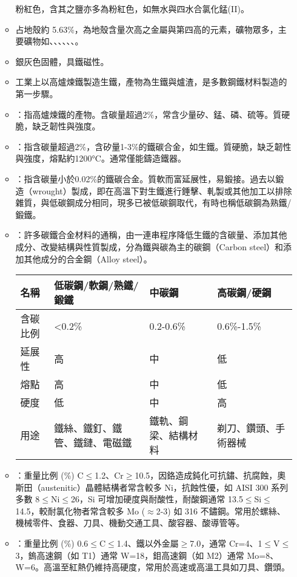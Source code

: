 \documentclass[a4paper,12pt]{report}
\begin{document}
\begin{itemize}
\begin{itemize}
粉紅色，含其之鹽亦多為粉紅色，如無水與四水合氯化錳(II)。
\bit
\item 占地殼約 5.63\%，為地殼含量次高之金屬與第四高的元素，礦物眾多，主要礦物如、、、、、、。
\item 銀灰色固體，具鐵磁性。
\item 工業上以高爐煉鐵製造生鐵，產物為生鐵與爐渣，是多數鋼鐵材料製造的第一步驟。
\item {}：指高爐煉鐵的產物。含碳量超過2\%，常含少量矽、錳、磷、硫等。質硬脆，缺乏韌性與強度。
\item {}：指含碳量超過2\%，含矽量1-3\%的鐵碳合金，如生鐵。質硬脆，缺乏韌性與強度，熔點約1200°C。通常僅能鑄造鐵器。
\item {}：指含碳量小於0.02\%的鐵碳合金。質軟而富延展性，易鍛接。過去以鍛造（wrought）製成，即在高溫下對生鐵進行錘擊、軋製或其他加工以排除雜質，與低碳鋼成分相同，現多已被低碳鋼取代，有時也稱低碳鋼為熟鐵/鍛鐵。
\item {}：許多碳鐵合金材料的通稱，由一連串程序降低生鐵的含碳量、添加其他成分、改變結構與性質製成，分為鐵與碳為主的碳鋼（Carbon steel）和添加其他成分的合金鋼（Alloy steel）。
\eit
{}
\begin{longtable}[c]{|p{0.2\tw}|p{0.2\tw}|p{0.2\tw}|p{0.2\tw}|}
\hline
名稱 & 低碳鋼/軟鋼/熟鐵/鍛鐵 & 中碳鋼 & 高碳鋼/硬鋼 \\\hline
含碳比例 & <0.2\% & 0.2-0.6\% & 0.6\%-1.5\% \\\hline
延展性 & 高 & 中 & 低 \\\hline
熔點 & 高 & 中 & 低 \\\hline
硬度 & 低 & 中 & 高 \\\hline
用途 & 鐵絲、鐵釘、鐵管、鐵鏈、電磁鐵 & 鐵軌、鋼梁、結構材料 & 剃刀、鑽頭、手術器械 \\\hline
\end{longtable}\FloatBarrier
{}
\bit
\item {}：重量比例 (\%) C$\leq$1.2、Cr$\geq$10.5，因鉻造成鈍化可抗鏽、抗腐蝕，奧斯田（austenitic）晶體結構者常含較多 Ni，抗蝕性優，如 AISI 300 系列多數 8$\leq$Ni$\leq$26，Si 可增加硬度與耐酸性，耐酸鋼通常 13.5$\leq$Si$\leq$14.5，較耐氯化物者常含較多 Mo ($\approx$2-3) 如 316 不鏽鋼。常用於螺絲、機械零件、食器、刀具、機動交通工具、酸容器、酸導管等。
\item {}：重量比例 (\%) 0.6$\leq$C$\leq$1.4、鐵以外金屬$\geq$7.0，通常 Cr=4、1$\leq$V$\leq$3，鎢高速鋼（如 T1）通常 W=18，鉬高速鋼（如 M2）通常 Mo=8、W=6。高溫至紅熱仍維持高硬度，常用於高速或高溫工具如刀具、鑽頭。
\eit


\end{itemize}
\end{itemize}
\end{document}
